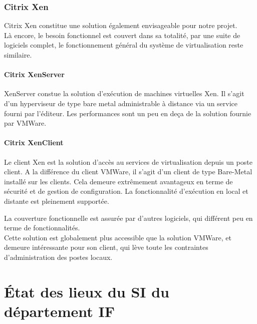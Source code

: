 \subsubsection{Citrix Xen}

Citrix Xen constitue une solution également envisageable pour notre projet. \\
Là encore, le besoin fonctionnel est couvert dans sa totalité, par une suite de logiciels complet, le fonctionnement général du système de virtualisation reste similaire.

\paragraph{Citrix XenServer}
XenServer constue la solution d'exécution de machines virtuelles Xen. Il s'agit d'un hyperviseur de type bare metal administrable à distance via un service fourni par l'éditeur. Les performances sont un peu en deça de la solution fournie par VMWare.

\paragraph{Citrix XenClient}
Le client Xen est la solution d'accès au services de virtualisation depuis un poste client. A la différence du client VMWare, il s'agit d'un client de type Bare-Metal installé sur les clients. Cela demeure extrêmement avantageux en terme de sécurité et de gestion de configuration. La fonctionnalité d'exécution en local et distante est pleinement supportée.

La couverture fonctionnelle est assurée par d'autres logiciels, qui différent peu en terme de fonctionnalités.\\

Cette solution est globalement plus accessible que la solution VMWare, et demeure intéressante pour son client, qui lève toute les contraintes d'administration des postes locaux. 

\section{État des lieux du SI du département IF}

